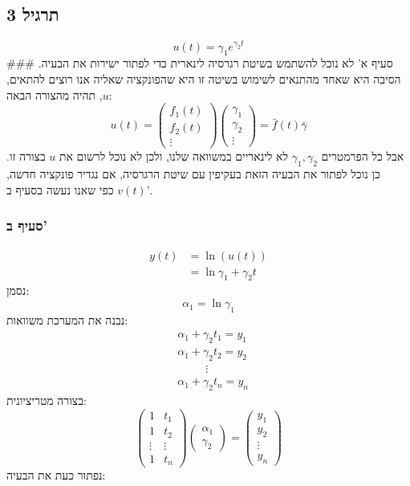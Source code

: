 \documentclass[
]{article}
\begin{document}
\subsection{תרגיל 3}\label{ux5eaux5e8ux5d2ux5d9ux5dc-3}

\[u(t)={\gamma}_{1}e^{{\gamma}_{2}t}\] \#\#\# סעיף א' לא נוכל להשתמש
בשיטת רגרסיה לינארית כדי לפתור ישירות את הבעיה. הסיבה היא שאחד מהתנאים
לשימוש בשיטה זו היא שהפונקציה שאליה אנו רוצים להתאים, \(u\), תהיה מהצורה
הבאה: \[u(t)=\begin{pmatrix}
{f}_{1}(t) \\
{f}_{2}(t) \\
\vdots 
\end{pmatrix}\begin{pmatrix}
{\gamma}_{1} \\
{\gamma}_{2} \\
\vdots 
\end{pmatrix}=\bar{f}(t)\bar{\gamma}\] אבל כל הפרמטרים
\({\gamma}_{1},{\gamma}_{2}\) לא לינאריים במשוואה שלנו, ולכן לא נוכל
לרשום את \(u\) בצורה זו. כן נוכל לפתור את הבעיה הזאת בעקיפין עם שיטת
הרגרסיה, אם נגדיר פונקציה חדשה, \(v(t)\) כפי שאנו נעשה בסעיף ב'.

\subsubsection{סעיף ב'}\label{ux5e1ux5e2ux5d9ux5e3-ux5d1-2}

\[\begin{aligned}
y(t)&=\ln (u(t)) \\
&=\ln{\gamma}_{1}+{\gamma}_{2} t
\end{aligned}\] נסמן: \[{\alpha}_{1}=\ln{\gamma}_{1}\] נבנה את המערכת
משוואות: \[\begin{aligned}
 & {\alpha}_{1}+{\gamma}_{2}{t}_{1}={y}_{1} \\
 & {\alpha}_{1}+{\gamma}_{2}{t}_{2}={y}_{2} \\
 &  \quad \quad \,\,\, \vdots  \\
 & {\alpha}_{1}+{\gamma}_{2}t_{n}=y_{n}
\end{aligned}\] בצורה מטריציונית: \[\begin{pmatrix}
1 & {t}_{1} \\
1 & {t}_{2} \\
\vdots  & \vdots  \\
1 & t_{n}
\end{pmatrix}\begin{pmatrix}
{\alpha}_{1} \\
{\gamma}_{2}
\end{pmatrix}=\begin{pmatrix}
{y}_{1} \\
{y}_{2} \\
\vdots  \\
y_{n}
\end{pmatrix}\] נפתור כעת את הבעיה:
\end{document}
